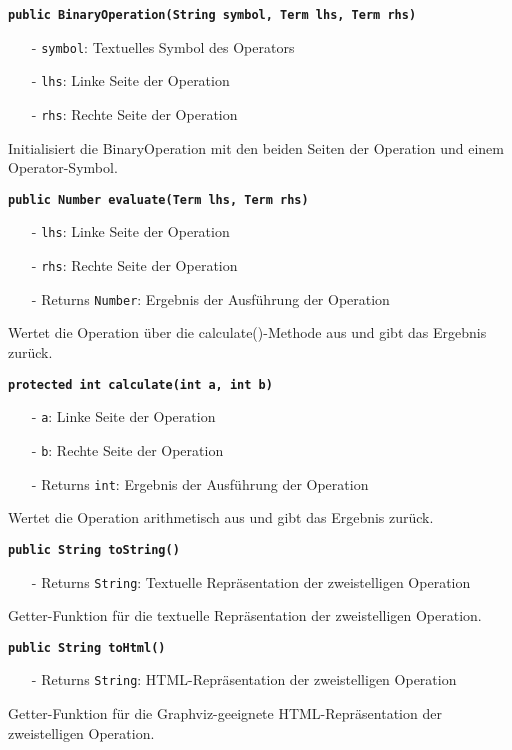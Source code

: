 \documentclass[parskip=full,11pt,twoside]{scrartcl}
\begin{document}
\textbf{\texttt{public BinaryOperation(String symbol, Term lhs, Term rhs)}}
\begin{itemize}[noitemsep]
	\item[-] \texttt{symbol}: Textuelles Symbol des Operators
	\item[-] \texttt{lhs}: Linke Seite der Operation
	\item[-] \texttt{rhs}: Rechte Seite der Operation
\end{itemize}
Initialisiert die BinaryOperation mit den beiden Seiten der Operation und einem Operator-Symbol.

\textbf{\texttt{public Number evaluate(Term lhs, Term rhs)}}
\begin{itemize}[noitemsep]
	\item[-] \texttt{lhs}: Linke Seite der Operation
	\item[-] \texttt{rhs}: Rechte Seite der Operation
	\item[-] Returns \texttt{Number}: Ergebnis der Ausführung der Operation
\end{itemize}
Wertet die Operation über die calculate()-Methode aus und gibt das Ergebnis zurück.

\textbf{\texttt{protected int calculate(int a, int b)}}
\begin{itemize}[noitemsep]
	\item[-] \texttt{a}: Linke Seite der Operation
	\item[-] \texttt{b}: Rechte Seite der Operation
	\item[-] Returns \texttt{int}: Ergebnis der Ausführung der Operation
\end{itemize}
Wertet die Operation arithmetisch aus und gibt das Ergebnis zurück.

\textbf{\texttt{public String toString()}}
\begin{itemize}[noitemsep]
	\item[-] Returns \texttt{String}: Textuelle Repräsentation der zweistelligen Operation
\end{itemize}
Getter-Funktion für die textuelle Repräsentation der zweistelligen Operation.

\textbf{\texttt{public String toHtml()}}
\begin{itemize}[noitemsep]
	\item[-] Returns \texttt{String}: HTML-Repräsentation der zweistelligen Operation
\end{itemize}
Getter-Funktion für die Graphviz-geeignete HTML-Repräsentation der zweistelligen Operation.
\end{document}
